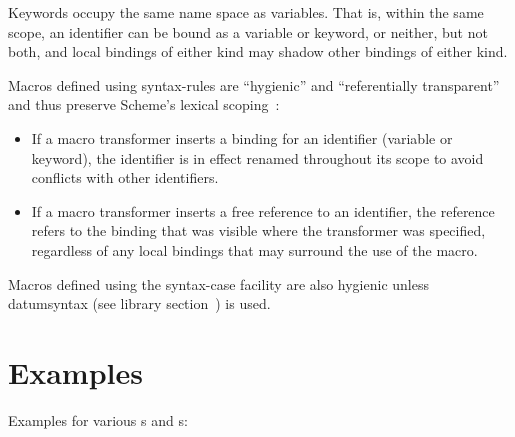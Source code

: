 Keywords occupy the same name space as variables.
That is, within the same
scope, an identifier can be bound as a variable or keyword, or neither, but
not both, and local bindings of either kind may shadow other bindings of
either kind.

Macros defined using {\cf syntax-rules} are ``hygienic'' and ``referentially
transparent'' and thus preserve Scheme's lexical scoping~\cite{Kohlbecker86,
hygienic,Bawden88,macrosthatwork,syntacticabstraction}:

\begin{itemize}
\item If a macro transformer inserts a binding for an identifier
(variable or keyword), the identifier is in effect renamed
throughout its scope to avoid conflicts with other identifiers.

\item If a macro transformer inserts a free reference to an
identifier, the reference refers to the binding that was visible
where the transformer was specified, regardless of any local
bindings that may surround the use of the macro.
\end{itemize}

Macros defined using the {\cf syntax-case} facility are also
hygienic unless {\cf datum\coerce{}syntax}
(see library section~) is used.

\section{Examples}

Examples for various s and s:

